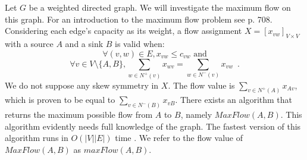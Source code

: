 \documentclass[11pt]{llncs}
\theoremstyle{definition}
\begin{document}
    Let $G$ be a weighted directed graph. We will investigate the maximum flow on this graph. For an introduction to the
    maximum flow problem see \cite{clrs} p. 708. Considering each edge's capacity as its weight, a flow assignment
    $X = [x_{vw}]_{V \times V}$ with a source $A$ and a sink $B$ is valid when:
    \begin{equation}
    \label{flow1}
       \forall (v, w) \in E, x_{vw} \leq c_{vw} \mbox{ and}
    \end{equation}
    \begin{equation}
    \label{flow2}
       \forall v \in V \setminus \{A,B\}, \sum\limits_{w \in N^{+}(v)}x_{wv} = \sum\limits_{w \in N^{-}(v)}x_{vw}
       \enspace.
    \end{equation}
    We do not suppose any skew symmetry in $X$. The flow value is $\sum\limits_{v \in N^{+}\left(A\right)}x_{Av}$, which is
    proven to be equal to $\sum\limits_{v \in N^{-}\left(B\right)}x_{vB}$. There exists an algorithm that returns the maximum
    possible flow from $A$ to $B$, namely $MaxFlow\left(A, B\right)$. This algorithm evidently needs full knowledge of the
    graph. The fastest version of this algorithm runs in $O\left(|V||E|\right)$ time \cite{maxflownm}. We refer to the flow
    value of $MaxFlow\left(A, B\right)$ as $maxFlow\left(A, B\right)$.
\end{document}
